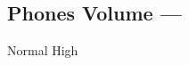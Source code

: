 \subsection[Phones Volume]{Phones Volume --- \UiKey{\SET}}









































Normal
High

